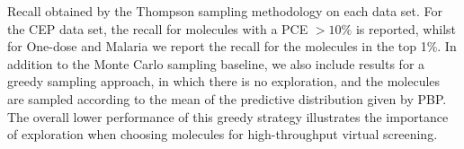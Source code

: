Recall obtained by the Thompson sampling methodology on each data set. For the CEP data set, the recall for molecules with a PCE $>10\%$ is reported, whilst for One-dose and Malaria we report the recall for the molecules in the top 1\%. In addition to the Monte Carlo sampling baseline, we also include results for a greedy sampling approach, in which there is no exploration, and the molecules are sampled according to the mean of the predictive distribution given by PBP. The overall lower performance of this greedy strategy illustrates the importance of exploration when choosing molecules for high-throughput virtual screening.\label{fig:thompson_1pc}